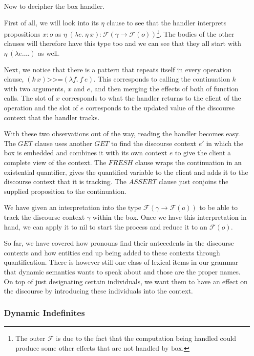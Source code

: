\documentclass{article}
\newcommand{\hsbind}{\mathbin{\texttt{>>=}}}
\begin{document}
Now to decipher the $\mathrm{box}$ handler.

First of all, we will look into its $\eta$ clause to see that the handler
interprets propositions $x : o$ as $\eta\ (\lambda e.\ \eta\ x) :
\mathcal{F}(\gamma \to \mathcal{F}(o))$\footnote{The outer $\mathcal{F}$ is
  due to the fact that the computation being handled could produce some
  other effects that are not handled by $\mathrm{box}$.}. The bodies of the
other clauses will therefore have this type too and we can see that they
all start with $\eta\ (\lambda e. \ldots)$ as well.

Next, we notice that there is a pattern that repeats itself in every
operation clause, $(k\ x) \hsbind (\lambda f.\ f\ e)$. This corresponds to
calling the continuation $k$ with two arguments, $x$ and $e$, and then
merging the effects of both of function calls. The slot of $x$ corresponds
to what the handler returns to the client of the operation and the slot of
$e$ corresponds to the updated value of the discourse context that the
handler tracks.

With these two observations out of the way, reading the handler becomes
easy. The $GET$ clause uses another $GET$ to find the discourse context
$e'$ in which the box is embedded and combines it with its own context $e$
to give the client a complete view of the context. The $FRESH$ clause wraps
the continuation in an existential quantifier, gives the quantified
variable to the client and adds it to the discourse context that it is
tracking. The $ASSERT$ clause just conjoins the supplied proposition to the
continuation.

We have given an interpretation into the type $\mathcal{F}(\gamma \to
\mathcal{F}(o))$ to be able to track the discourse context $\gamma$ within
the box. Once we have this interpretation in hand, we can apply it to
$\mathrm{nil}$ to start the process and reduce it to an $\mathcal{F}(o)$.

So far, we have covered how pronouns find their antecedents in the
discourse contexts and how entities end up being added to these contexts
through quantification. There is however still one class of lexical items
in our grammar that dynamic semantics wants to speak about and those are
the proper names. On top of just designating certain individuals, we want
them to have an effect on the discourse by introducing these individuals
into the context.

\subsubsection{Dynamic Indefinites}
\end{document}
